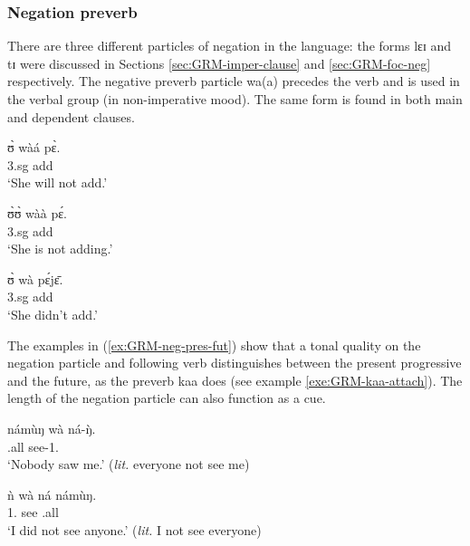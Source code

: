 \begin{exe}
\begin{exe}
\begin{exe}
{\begin{exe}
\begin{exe}
\begin{exe}
\begin{exe}
\begin{exe}
\begin{exe}
\begin{exe}
\begin{exe}
\begin{exe}
\begin{exe}
\begin{exe}
\begin{exe}
\begin{exe}
\begin{exe}
\begin{exe}
\begin{exe}
\begin{exe}
\begin{exe}
\begin{exe}
\begin{exe}
\subsubsection{Negation preverb}
\label{sec:GRM-verb-neg}



There are three different particles of negation in the language:  the forms 
{\sls lɛɪ} and {\sls tɪ}   were discussed in Sections 
\ref{sec:GRM-imper-clause} 
and  \ref{sec:GRM-foc-neg}  respectively.  The negative preverb particle {\sls 
wa(a)} precedes the verb and is used in the verbal group (in non-imperative
mood). The same form is found in both  main and dependent clauses. 


\ea\label{ex:GRM-neg-pres-fut}

\ea
\gll ʊ̀  wàá pɛ̀.\\
   {\sc 3.sg}  {\neg} add\\
\glt  `She will not add.'

 \ex 
\gll  ʊ̀ʊ̀ wàà pɛ́.\\
  {\sc 3.sg} {\neg} add\\
\glt  `She is not adding.'


 \ex 
\gll  ʊ̀ wà pɛ́jɛ̄.\\
  {\sc 3.sg} {\neg} add\\
\glt  `She didn't  add.'

\z 
 \z

 The examples in (\ref{ex:GRM-neg-pres-fut}) show that a tonal quality on the 
negation particle and following verb  distinguishes between the present 
progressive and  the future,  as the preverb {\sls kaa} does (see example 
\ref{exe:GRM-kaa-attach}). The length of the negation particle can also 
function as a cue.

\ea\label{ex:neg-quant-any}
\ea\label{ex:neg-quant-any-1}
\gll námùŋ wà ná-ŋ̀.\\
 {\clf}.all {\neg} see-{1.\sg}\\
\glt  `Nobody saw me.' ({\it lit.} everyone not see me) 

\ex\label{ex:neg-quant-any-2}
\gll  ǹ wà ná námùŋ.\\
  {1.\sg}  {\neg}   see  {\clf}.all\\
\glt  `I did not see anyone.' ({\it lit.} I not see everyone) 

\z 
 \z


\end{exe}
\end{exe}
\end{exe}
\end{exe}
\end{exe}
\end{exe}
\end{exe}
\end{exe}
\end{exe}
\end{exe}
\end{exe}
\end{exe}
\end{exe}
\end{exe}
\end{exe}
\end{exe}
\end{exe}
\end{exe}
\end{exe}
\end{exe}}
\end{exe}
\end{exe}
\end{exe}
